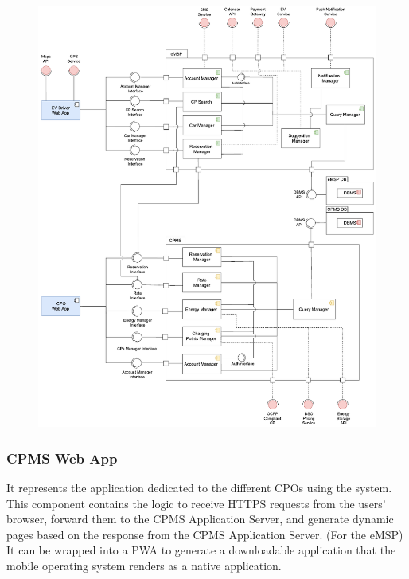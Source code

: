 \begin{figure}[H]
    \centering
    \includegraphics[scale=1]{src/ComponentDiagram/component_diagram.pdf}
\end{figure} \vspace{1cm}

\subsubsection{CPMS Web App}
It represents the application dedicated to the different CPOs using the system. This component contains the logic to receive HTTPS requests from the users' browser,
forward them to the CPMS Application Server, and generate dynamic pages based on the response from the CPMS Application Server. (For the eMSP) It can be wrapped into a PWA to generate a downloadable application that
the mobile operating system renders as a native application.

